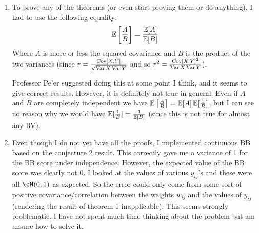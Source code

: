 \documentclass[11pt]{hw-template}
\begin{document}
  \begin{enumerate}[label=(\arabic*)]
     \item To prove any of the theorems (or even start proving them or do anything), I had to use the following equality:
     $$\operatorname{\mathbb{E}}\left[\frac{A}{B}\right] = \frac{\operatorname{\mathbb{E}}[A]}{\operatorname{\mathbb{E}}[B]}$$
     Where $A$ is more or less the squared covariance and $B$ is the product of the two variances (since $r = \frac{\operatorname{Cov}[X, Y]}{\sqrt{\operatorname{Var}{X}\operatorname{Var}{Y}}}$ and so $r^2 = \frac{\operatorname{Cov}[X, Y]^2}{\operatorname{Var}{X}\operatorname{Var}{Y}}$).
     
     Professor Pe'er suggested doing this at some point I think, and it seems to give correct results. However, it is definitely not true in general. Even if $A$ and $B$ are completely independent we have
     $\operatorname{\mathbb{E}}\left[\frac{A}{B}\right] = \operatorname{\mathbb{E}}[A]\operatorname{\mathbb{E}}[\frac{1}{B}]$, but I can see no reason why we would have $\operatorname{\mathbb{E}}[\frac{1}{B}] = \frac{1}{\operatorname{\mathbb{E}}[B]}$ (since this is not true for almost any RV).
     
     \item Even though I do not yet have all the proofs, I implemented continuous BB based on the conjecture 2 result. This correctly gave me a variance of 1 for the BB score under independence. However,
     the expected value of the BB score was clearly not 0. I looked at the values of various $y_{ij}$'s and these were all $\cN(0, 1)$ as expected. So the error could only come from some sort of positive
     covariance/correlation between the weights $w_{ij}$ and the values of $y_{ij}$ (rendering the result of theorem 1 inapplicable). This seems strongly problematic. 
     I have not spent much time thinking about the problem but am unsure how to solve it.
  \end{enumerate}
\end{document}
